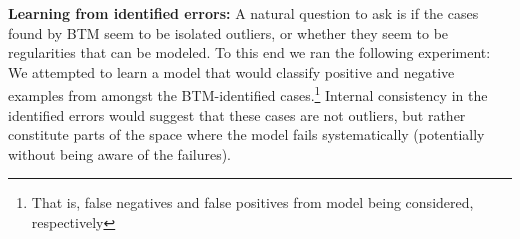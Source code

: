 
\textbf{Learning from identified errors:}  A natural question to ask is if the cases found by BTM seem to be isolated outliers, or whether they seem to be regularities that can be modeled. To this end we ran the following experiment: We attempted to learn a model that would classify positive and negative examples from amongst the BTM-identified cases.\footnote{That is, false negatives and false positives from model being considered, respectively } Internal consistency in the identified errors would suggest that these cases are not outliers, but rather constitute parts of the space where the model fails systematically (potentially without being aware of the failures).


